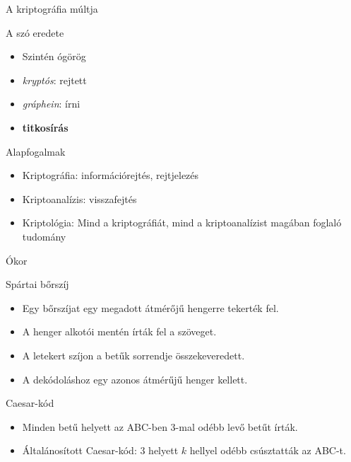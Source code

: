 \documentclass[12 pt]{beamer}
\begin{document}

\begin{frame}{A kriptográfia múltja}
  \begin{block}{A szó eredete}
    \begin{itemize}
      \item{Szintén ógörög}
      \item{\textit{kryptós}: rejtett}
      \item{\textit{gráphein}: írni}
      \item{\textbf{titkosírás}}
    \end{itemize}
  \end{block}

  \begin{block}{Alapfogalmak}
    \begin{itemize}
      \item{Kriptográfia: információrejtés, rejtjelezés}
      \item{Kriptoanalízis: visszafejtés}
      \item{Kriptológia: Mind a kriptográfiát, mind a kriptoanalízist magában foglaló tudomány}
    \end{itemize}
  \end{block}

\end{frame}


\begin{frame}{Ókor}
  \begin{block}{Spártai bőrszíj}
    \begin{itemize}
      \item{Egy bőrszíjat egy megadott átmérőjű hengerre tekerték fel.}
      \item{A henger alkotói mentén írták fel a szöveget.}
      \item{A letekert szíjon a betűk sorrendje összekeveredett.}
      \item{A dekódoláshoz egy azonos átmérűjű henger kellett.}
    \end{itemize}
  \end{block}

  \begin{block}{Caesar-kód}
    \begin{itemize}
      \item{Minden betű helyett az ABC-ben 3-mal odébb levő betűt írták.}
      \item{Általánosított Caesar-kód: 3 helyett $k$ hellyel odébb csúsztatták az ABC-t.}
    \end{itemize}
  \end{block}

\end{frame}
\end{document}
